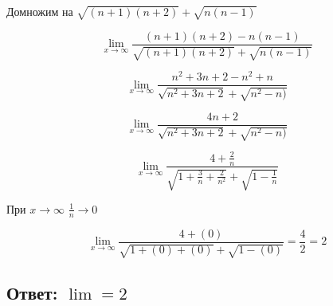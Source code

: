 \documentclass[a4paper]{article}
\begin{document}
Домножим на $\sqrt{(n+1)(n+2)} + \sqrt{n(n-1)}$

$$ \displaystyle{\lim_{x \to \infty}}\frac{(n+1)(n+2) - n(n-1)}{\sqrt{(n+1)(n+2)} + \sqrt{n(n-1)}} $$

$$ \displaystyle{\lim_{x \to \infty}}\frac{ n^2 + 3n + 2 - n^2 + n}{\sqrt{n^2 + 3n + 2} + \sqrt{n^2-n)}} $$

$$ \displaystyle{\lim_{x \to \infty}}\frac{ 4n + 2 }{\sqrt{n^2 + 3n + 2} + \sqrt{n^2-n)}} $$

$$ \displaystyle{\lim_{x \to \infty}}\frac{ 4 + \frac{2}{n} }{\sqrt{1 + \frac{3}{n} + \frac{2}{n^2}} + \sqrt{1-\frac{1}{n}}} $$

При $x \to \infty$ $\frac{1}{n} \to 0$

$$ \displaystyle{\lim_{x \to \infty}}\frac{ 4 + (0) }{\sqrt{1 + (0) + (0)} + \sqrt{1-(0)}} = \frac{4}{2} = 2 $$

\subsection*{Ответ: $\lim = 2$}
\end{document}
